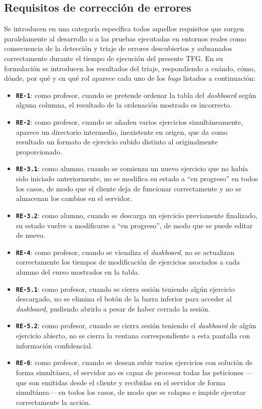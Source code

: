 \subsection{Requisitos de corrección de errores}
\label{subsec:listaReqsErrores}
Se introducen en una categoría específica todos aquellos requisitos que surgen paralelamente al desarrollo o a las pruebas ejecutadas en entornos reales como consecuencia de la detección y triaje de errores descubiertos y subsanados correctamente durante el tiempo de ejecución del presente TFG. En su formulación se introducen los resultados del triaje, respondiendo a cuándo, cómo, dónde, por qué y en qué rol aparece cada uno de los \textit{bugs} listados a continuación:
\begin{itemize}
    \item \texttt{\textbf{RE-1}}: como profesor, cuando se pretende ordenar la tabla del \textit{dashboard} según alguna columna, el resultado de la ordenación mostrado es incorrecto.
    \item \texttt{\textbf{RE-2}}: como profesor, cuando se añaden varios ejercicios simultáneamente, aparece un directorio intermedio, inexistente en origen, que da como resultado un formato de ejercicio subido distinto al originalmente proporcionado.
    \item \texttt{\textbf{RE-3.1}}: como alumno, cuando se comienza un nuevo ejercicio que no había sido iniciado anteriormente, no se modifica su estado a ``en progreso'' en todos los casos, de modo que el cliente deja de funcionar correctamente y no se almacenan los cambios en el servidor.
    \item \texttt{\textbf{RE-3.2}}: como alumno, cuando se descarga un ejercicio previamente finalizado, su estado vuelve a modificarse a ``en progreso'', de modo que se puede editar de nuevo.
    \item \texttt{\textbf{RE-4}}: como profesor, cuando se visualiza el \textit{dashboard}, no se actualizan correctamente los tiempos de modificación de ejercicios asociados a cada alumno del curso mostrados en la tabla.
    \item \texttt{\textbf{RE-5.1}}: como profesor, cuando se cierra sesión teniendo algún ejercicio descargado, no se elimina el botón de la barra inferior para acceder al \textit{dashboard}, pudiendo abrirlo a pesar de haber cerrado la sesión.
    \item \texttt{\textbf{RE-5.2}}: como profesor, cuando se cierra sesión teniendo el \textit{dashboard} de algún ejercicio abierto, no se cierra la ventana correspondiente a esta pantalla con información confidencial.
    \item \texttt{\textbf{RE-6}}: como profesor, cuando se desean subir varios ejercicios con solución de forma simultánea, el servidor no es capaz de procesar todas las peticiones ---que son emitidas desde el cliente y recibidas en el servidor de forma simultánea--- en todos los casos, de modo que se colapsa e impide ejecutar correctamente la acción.
\end{itemize}